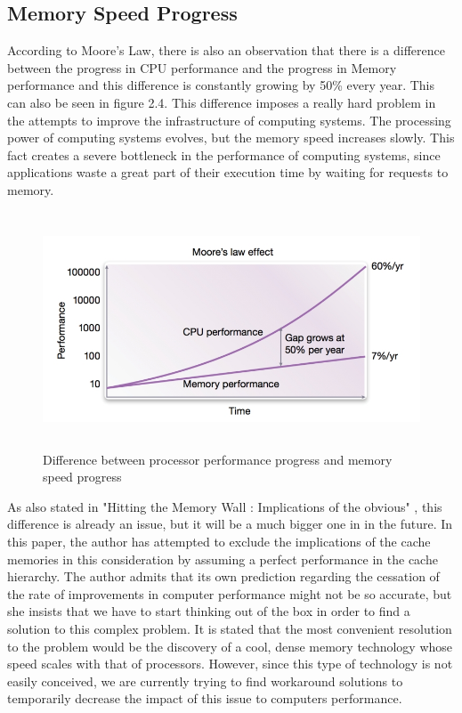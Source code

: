 \documentclass[diploma]{Styles/softlab-thesis}
\begin{document}
\subsection{Memory Speed Progress}

According to Moore's Law, there is also an observation that there is a difference between the progress in CPU performance and the progress in Memory performance and this difference is constantly growing by 50\% every year. This can also be seen in figure 2.4. This difference imposes a really hard problem in the attempts to improve the infrastructure of computing systems. The processing power of computing systems evolves, but the memory speed increases slowly. This fact creates a severe bottleneck in the performance of computing systems, since applications waste a great part of their execution time by waiting for requests to memory.

\begin{figure}[ht!]
\begin{center}
\includegraphics[width=150mm, height=70mm]{images/memory-wall.jpg}
\caption{Difference between processor performance progress and memory speed progress \label{overflow}}
\end{center}
\end{figure}

As also stated in "Hitting the Memory Wall : Implications of the obvious" \cite{reference5}, this difference is already an issue, but it will be a much bigger one in in the future. In this paper, the author has attempted to exclude the implications of the cache memories in this consideration by assuming a perfect performance in the cache hierarchy. The author admits that its own prediction regarding the cessation of the rate of improvements in computer performance might not be so accurate, but she insists that we have to start thinking out of the box in order to find a solution to this complex problem. It is stated that the most convenient resolution to the problem would be the discovery of a cool, dense memory technology whose speed scales with that of processors. However, since this type of technology is not easily conceived, we are currently trying to find workaround solutions to temporarily decrease the impact of this issue to computers performance.
\end{document}
